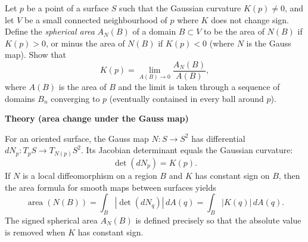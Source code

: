 \begin{problem}
\label{prob:cp-vii-0050}
Let $p$ be a point of a surface $S$ such that the Gaussian curvature $K(p)\neq 0$, and let $V$
	be a small connected neighbourhood of $p$ where $K$ does not change sign.
	Define the \emph{spherical area} $A_N(B)$ of a domain $B\subset V$ to be the area of $N(B)$ if
	$K(p)>0$, or minus the area of $N(B)$ if $K(p)<0$ (where $N$ is the Gauss map).
	Show that
	\[
	K(p)=\lim_{A(B)\to 0}\frac{A_N(B)}{A(B)},
	\]
	where $A(B)$ is the area of $B$ and the limit is taken through a sequence of domains $B_n$
	converging to $p$ (eventually contained in every ball around $p$).
	
	\par\medskip\noindent\textbf{Theory (area change under the Gauss map)}\par\smallskip

	For an oriented surface, the Gauss map $N:S\to S^2$ has differential $dN_p:T_pS\to T_{N(p)}S^2$.
	Its Jacobian determinant equals the Gaussian curvature:
	\[
	\det(dN_p)=K(p).
	\]
	If $N$ is a local diffeomorphism on a region $B$ and $K$ has constant sign on $B$, then the area
	formula for smooth maps between surfaces yields
	\[
	\operatorname{area}(N(B))=\int_B |\det(dN_q)|\,dA(q)=\int_B |K(q)|\,dA(q).
	\]
	The signed spherical area $A_N(B)$ is defined precisely so that the absolute value is removed when
	$K$ has constant sign.
\end{problem}

